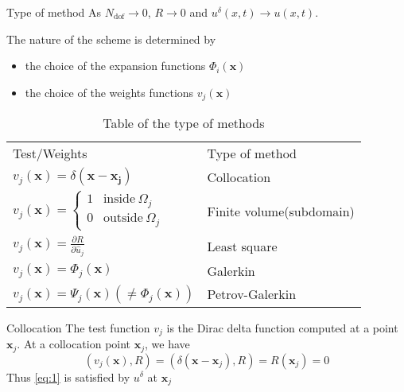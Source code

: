 \begin{frame}{Type of method}
  As $N_{\text{dof}} \rightarrow 0$, $R \rightarrow 0$ and
  $u^{\delta}(x,t) \rightarrow u(x,t)$.

  The nature of the scheme is determined by 
  \begin{itemize}
  \item the choice of the expansion functions $\Phi_i(\mathbf{x})$
  \item the choice of the weights functions $v_j(\mathbf{x})$
  \end{itemize}
  
  \begin{table}[H]
    \centering
    
    \begin{tabular}[c]{ll}
    \rowcolor[gray]{1}
    Test/Weights & Type of method\\

    \rowcolor[gray]{.7}
    $v_j(\mathbf{x}) = \delta(\mathbf{x} - \mathbf{x_j})$ 	& Collocation \\
    
    
    \rowcolor[gray]{1}
    $v_j(\mathbf{x})= 
      \begin{cases}
        1 & \text{inside} \ \Omega_j\\
        0 & \text{outside} \ \Omega_j
      \end{cases}$ & Finite volume(subdomain)\\
    
    \rowcolor[gray]{.7}
    $v_j(\mathbf{x}) = \frac{\partial R}{\partial \hat{u}_j}$ & Least square\\
    
    \rowcolor[gray]{1}
    $v_j(\mathbf{x}) = \Phi_j(\mathbf{x})$ & Galerkin\\

    \rowcolor[gray]{.7}
    $v_j(\mathbf{x}) = \Psi_j(\mathbf{x}) (\neq \Phi_j(\mathbf{x}))$ & Petrov-Galerkin\\
    \end{tabular}
    \caption{Table of the type of methods}
    \label{tab:1}
  \end{table}
  
\end{frame}

\begin{frame}{Collocation}
  The test function $v_j$ is the Dirac delta function computed at a point $\mathbf{x}_j$.
  At a collocation point $\mathbf{x}_j$, we have
  \begin{equation}
    \label{eq:6}
    ( v_j(\mathbf{x}), R ) = ( \delta(\mathbf{x} - \mathbf{x}_j), R ) =  R(\mathbf{x}_j) = 0
  \end{equation}
  Thus \eqref{eq:1} is satisfied by $u^{\delta}$ at $\mathbf{x}_j$
\end{frame}

